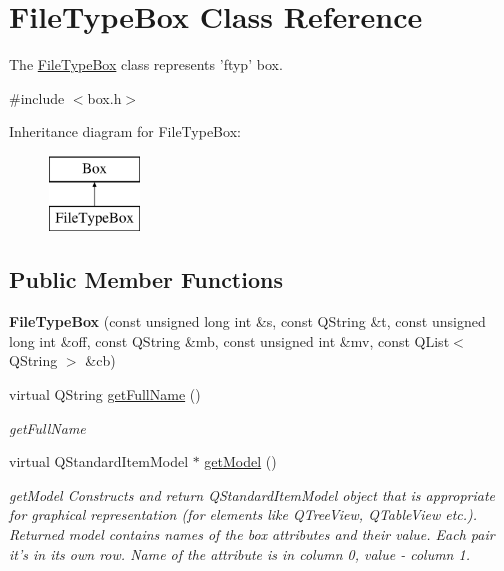 \hypertarget{class_file_type_box}{\section{File\-Type\-Box Class Reference}
\label{class_file_type_box}
}


The \hyperlink{class_file_type_box}{File\-Type\-Box} class represents 'ftyp' box.  




{\ttfamily \#include $<$box.\-h$>$}

Inheritance diagram for File\-Type\-Box\-:\begin{figure}[H]
\begin{center}
\leavevmode
\includegraphics[height=2.000000cm]{class_file_type_box}
\end{center}
\end{figure}
\subsection*{Public Member Functions}
\begin{DoxyCompactItemize}
\item 
\hypertarget{class_file_type_box_a9d4e67a72abcfe8b65ad8971d257d841}{{\bfseries File\-Type\-Box} (const unsigned long int \&s, const Q\-String \&t, const unsigned long int \&off, const Q\-String \&mb, const unsigned int \&mv, const Q\-List$<$ Q\-String $>$ \&cb)}\label{class_file_type_box_a9d4e67a72abcfe8b65ad8971d257d841}

\item 
virtual Q\-String \hyperlink{class_file_type_box_a680e45fdfe39b2e23ff46fc9f32153eb}{get\-Full\-Name} ()
\begin{DoxyCompactList}\small\item\em get\-Full\-Name \end{DoxyCompactList}\item 
virtual Q\-Standard\-Item\-Model $\ast$ \hyperlink{class_file_type_box_a0d7a5d446140b1d10c9ab36233e87550}{get\-Model} ()
\begin{DoxyCompactList}\small\item\em get\-Model Constructs and return Q\-Standard\-Item\-Model object that is appropriate for graphical representation (for elements like Q\-Tree\-View, Q\-Table\-View etc.). Returned model contains names of the box attributes and their value. Each pair it's in its own row. Name of the attribute is in column 0, value -\/ column 1. \end{DoxyCompactList}\end{DoxyCompactItemize}
